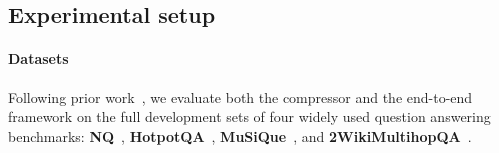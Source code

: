 \documentclass{applemlr}
\numberwithin{equation}{section}
\begin{document}
\subsection{Experimental setup}


\paragraph{Datasets}
Following prior work~\cite{shi2025directretrievalaugmentedoptimizationsynergizing}, we evaluate both the compressor and the end-to-end framework on the full development sets of four widely used question answering benchmarks: \textbf{NQ}~\citep{kwiatkowski-etal-2019-natural}, \textbf{HotpotQA}~\citep{yang-etal-2018-hotpotqa}, \textbf{MuSiQue}~\citep{trivedi-etal-2022-musique}, and \textbf{2WikiMultihopQA}~\citep{ho-etal-2020-constructing}. 
\end{document}
